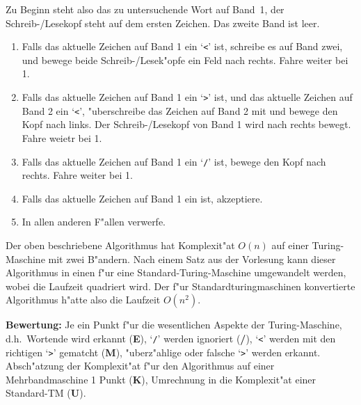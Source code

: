 \begin{loesung}
\begin{teilaufgaben}
Zu Beginn steht also das zu untersuchende Wort auf Band~1,
der Schreib-/Lesekopf steht auf dem ersten Zeichen.
Das zweite Band ist leer.
{
\renewcommand{\theenumii}{\arabic{enumii}}
\renewcommand{\labelenumii}{\theenumii.}
\begin{enumerate}
\item Falls das aktuelle Zeichen auf Band 1 ein `{\tt <}' ist,
schreibe es auf Band zwei, und bewege beide Schreib-/Lesek"opfe ein
Feld nach rechts. Fahre weiter bei 1.
\item Falls das aktuelle Zeichen auf Band 1 ein `{\tt >}' ist,
und das aktuelle Zeichen auf Band 2 ein `{\tt <}', "uberschreibe
das Zeichen auf Band 2 mit \textvisiblespace und bewege den Kopf
nach links. Der Schreib-/Lesekopf von Band 1 wird nach rechts bewegt.
Fahre weietr bei 1.
\item Falls das aktuelle Zeichen auf Band 1 ein `{\tt /}' ist, bewege
den Kopf nach rechts.
Fahre weiter bei 1.
\item Falls das aktuelle Zeichen auf Band 1 ein \textvisiblespace{} ist,
akzeptiere.
\item In allen anderen F"allen verwerfe.
\end{enumerate}
}
\item
Der oben beschriebene Algorithmus hat Komplexit"at $O(n)$ auf einer 
Turing-Maschine mit zwei B"andern. Nach einem Satz aus der Vorlesung
kann dieser Algorithmus in einen f"ur eine Standard-Turing-Maschine
umgewandelt werden, wobei die Laufzeit quadriert wird. Der f"ur 
Standardturingmaschinen konvertierte Algorithmus h"atte also die
Laufzeit $O(n^2)$.
\end{teilaufgaben}
\end{loesung}
{\bf Bewertung:}
Je ein Punkt f"ur die wesentlichen Aspekte der Turing-Maschine,
d.h.~Wortende wird erkannt ({\bf E}), `{\tt /}' werden ignoriert
({\bf /}), `{\tt <}' werden mit den richtigen `{\tt >}' gematcht ({\bf M}),
"uberz"ahlige oder falsche `{\tt >}' werden erkannt.
Absch"atzung der Komplexit"at f"ur den Algorithmus auf einer
Mehrbandmaschine 1 Punkt ({\bf K}), Umrechnung in die Komplexit"at
einer Standard-TM ({\bf U}).
